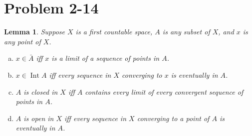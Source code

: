 \documentclass{article}
\newtheorem{lemma}[subsection]{Lemma}
\theoremstyle{definition}
\begin{document}
\section{Problem 2-14}
\begin{lemma}
Suppose $X$ is a first countable space, $A$ is any subset of $X$, and $x$ 
is any point of $X$.
\begin{enumerate}[(a)]
\item $x \in \bar{A}$ iff $x$ is a limit of a sequence of points in $A$.
\item $x \in \operatorname{Int} A$ iff every sequence in $X$ converging
to $x$ is eventually in $A$.
\item $A$ is closed in $X$ iff $A$ contains every limit of every convergent
sequence of points in $A$.
\item $A$ is open in $X$ iff every sequence in $X$ converging to a point of $A$ 
is eventually in $A$.
\end{enumerate}
\end{lemma}
\end{document}
